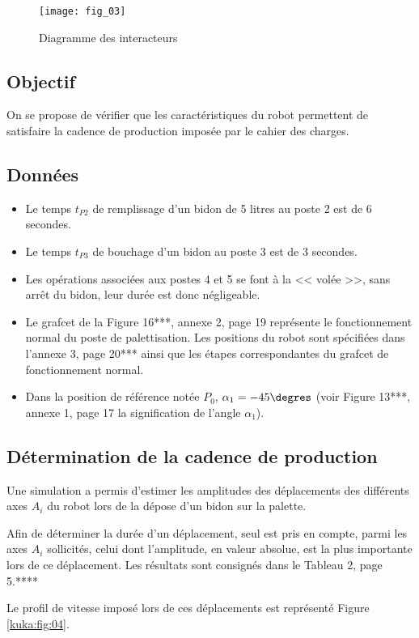 \begin{figure}[H]
\centering
\texttt{[image: fig\_03]}
\caption{Diagramme des interacteurs \label{kuka:fig:03}}
\end{figure}


\subsection{Objectif }
On se propose de vérifier que les caractéristiques du robot permettent de satisfaire la cadence 
de production imposée par le cahier des charges. 

\subsection{Données}
\begin{itemize}
\item Le temps $t_{P2}$ de remplissage d’un bidon de 5 litres au poste 2 est de 6 secondes. 
\item Le temps $t_{P3}$ de bouchage d’un bidon au poste 3 est de 3 secondes. 
\item Les opérations associées aux postes 4 et 5 se font à la << volée >>, sans arrêt du bidon,
leur durée est donc négligeable. 
\item Le grafcet de la Figure 16***, annexe 2, page 19 représente le fonctionnement normal du 
poste de palettisation. Les positions du robot sont spécifiées dans l’annexe 3, page 20***
ainsi que les étapes correspondantes du grafcet de fonctionnement normal. 
\item Dans la position de référence notée $P_0$, $\alpha_1 = -45\degres$ (voir Figure 13***, annexe 1, page 17 la signification de l’angle $\alpha_1$). 
\end{itemize}

\subsection{Détermination de la cadence de production}
Une simulation a permis d’estimer les amplitudes des déplacements des différents axes $A_i$ du robot lors de la dépose d’un bidon sur la palette. 

Afin de déterminer la durée d’un déplacement, seul est pris en compte, parmi les axes $A_i$ sollicités, celui dont l’amplitude, en valeur absolue, est la plus importante lors de ce déplacement. Les résultats sont consignés dans le Tableau 2, page 5.**** 

Le profil de vitesse imposé lors de ces déplacements est représenté Figure \ref{kuka:fig:04}.

